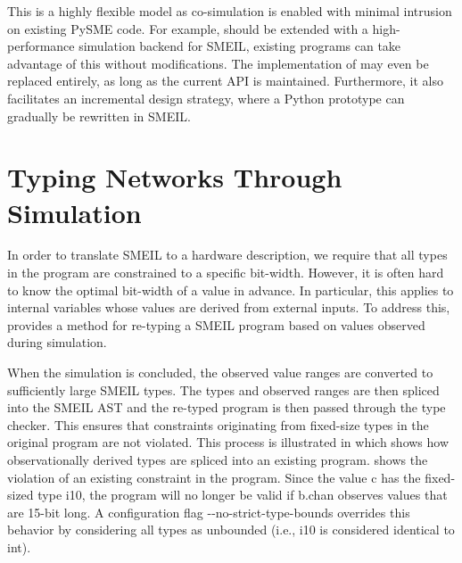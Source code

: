 This is a highly flexible model as co-simulation is enabled with minimal
intrusion on existing PySME code. For example, should \libsme{} be extended with
a high-performance simulation backend for SMEIL, existing programs can take
advantage of this without modifications. The implementation of \libsme{} may
even be replaced entirely, as long as the current API is
maintained. Furthermore, it also facilitates an incremental design strategy,
where a Python prototype can gradually be rewritten in SMEIL.



\section{Typing Networks Through Simulation}
\label{sec:typing}
  In order to translate SMEIL to a hardware
description, we require that all types in the program are constrained to a
specific bit-width. However, it is often hard to know the optimal bit-width of a
value in advance. In particular, this applies to internal variables whose values
are derived from external inputs. To address this, \libsme{} provides a method
for re-typing a SMEIL program based on values observed during simulation.

When the simulation is concluded, the observed value ranges are converted to
sufficiently large SMEIL types. The types and observed ranges are then spliced
into the SMEIL AST and the re-typed program is then passed through the type
checker. This ensures that constraints originating from fixed-size types in the
original program are not violated. This process is illustrated in
 which shows how observationally derived types are spliced
into an existing program.  shows the violation of an existing
constraint in the program. Since the value {\ttfamily c} has the fixed-sized
type {\ttfamily i10}, the program will no longer be valid if {\ttfamily b.chan}
observes values that are 15-bit long. A configuration flag {\ttfamily
  -{}-no-strict-type-bounds} overrides this behavior by considering all types as
unbounded (i.e., {\ttfamily i10} is considered identical to {\ttfamily int}).


